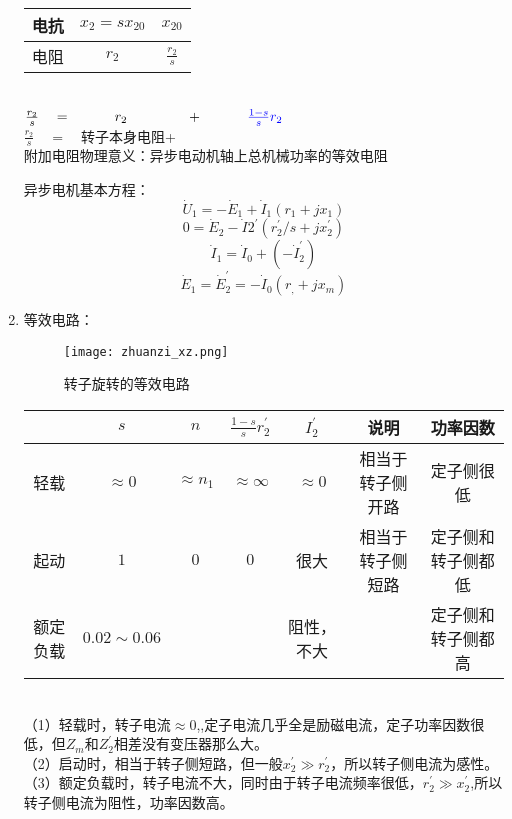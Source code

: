 \documentclass[blue]{elegantnote}
\begin{document}
\begin{enumerate}
\begin{table}[!h]
\begin{tabular}{|c|c|c|}
			电抗     &    $x_2=s x_{20}$    &   $x_{20}$   \\ \hline
			电阻  &   $r_2$    &    $\frac{r_2}{s}$    \\   \hline
		\end{tabular}
	\end{table}
	\begin{note}
		\\$\frac{r_2}{s}\quad=\quad \phantom{aaaa}r_2\phantom{aaaaaaaa}+\phantom{aaaaaa}{\color{blue}\frac{1-s}{s}r_2}$
		\\$\frac{r_2}{s}\quad=\quad$转子本身电阻\phantom{aaa}+
		\\{\color{blue}附加电阻物理意义：异步电动机轴上总机械功率的等效电阻}
	\end{note}
	异步电机基本方程：
	$$ \dot U_1=-\dot E_1+\dot I_1(r_1+jx_1) $$
	$$  0=\dot E_2-\dot I2^{'}(r_2^{'}/s+jx_2^{'}) $$
	$$  \dot I_1 = \dot I_0+(-\dot I_2^{'})  $$
	$$   \dot E_1 = \dot E_2^{'}=-\dot I_0(r_,+jx_m)  $$
	\item 等效电路：
	\begin{figure}[!hbtp]
		\centering
		\texttt{[image: zhuanzi\_xz.png]}
		\caption{转子旋转的等效电路\label{figur:zhuanzi_xz}}
	\end{figure}
	\begin{table}[!htbp]
		\centering
		\begin{tabular}{|c|c|c|c|c|c|c|}
			\hline
			& $s$ & $n$ & $\frac{1-s}{s}r_2^{'}$  &  $I_2^{'}$   &说明 & 功率因数               
			\\ \hline 轻载  & $\approx 0$ & $\approx n_1$ & $\approx\infty$ & $\approx 0$ & 相当于转子侧开路 &  定子侧很低
			\\ \hline 起动   &  $1$ & $0$  &  $0$ & 很大 &  相当于转子侧短路 & 定子侧和转子侧都低
			\\ \hline 额定负载  & $0.02\sim0.06$ & &  & 阻性，不大 &  & 定子侧和转子侧都高
			\\ \hline        
		\end{tabular}
	\end{table}
	\begin{note}
		\\（1）轻载时，转子电流$\approx 0$,,定子电流几乎全是励磁电流，定子功率因数很低，但$Z_m$和$Z_2^{'}$相差没有变压器那么大。
		\\（2）启动时，相当于转子侧短路，但一般$x_2^{'}\gg r_2^{'}$，所以转子侧电流为感性。
		\\（3）额定负载时，转子电流不大，同时由于{\color{main}转子电流频率很低}，$r_2^{'}\gg x_2^{'}$,所以转子侧电流为阻性，功率因数高。
	\end{note}
	

\end{enumerate}
\end{document}
